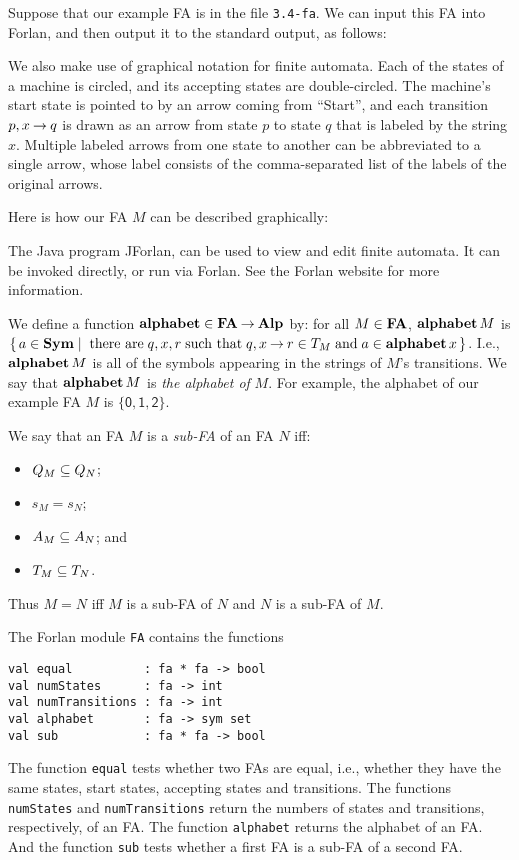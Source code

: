 Suppose that our example FA is in the file \texttt{3.4-fa}.
We can input this FA into Forlan, and then output it to the
standard output, as follows:


We also make use of graphical notation for finite automata.
Each of the states of a machine is circled,
and its accepting states are double-circled.  The machine's start state is
pointed to by an arrow coming from ``Start'', and
each transition $p, x\mathbin{\to} q$ is drawn as an arrow from state $p$
to state $q$ that is labeled by the string $x$.  Multiple labeled
arrows from one state to another can be abbreviated to a single
arrow, whose label consists of the comma-separated list of the
labels of the original arrows.

Here is how our FA $M$ can be described graphically:
\begin{center}

\end{center}

The Java program JForlan, can be used to view and edit finite
automata.  It can be invoked directly, or run via Forlan.  See the
Forlan website for more information.

We define a function $\mathbf{alphabet}\in\mathbf{FA}\mathbin{\to}\mathbf{Alp}$ by: for all $M\in\mathbf{FA}$,
$\mathbf{alphabet}\,M$ is $\{ \, a\in\mathbf{Sym} \mid \;\allowbreak\mbox{there are}\allowbreak\;q,x,r\;\allowbreak\mbox{such
    that}\allowbreak\; q,x\mathbin{\to} r\in T_M\;\allowbreak\mbox{and}\allowbreak\;a\in\mathbf{alphabet}\,x \, \}$.  I.e.,
$\mathbf{alphabet}\,M$ is all of the symbols appearing in the strings of $M$'s
transitions.  We say that $\mathbf{alphabet}\,M$ is \emph{the alphabet of}
$M$.  For example, the alphabet of our example FA $M$ is
$\{\mathsf{0,1,2}\}$.

We say that an FA $M$ is a \emph{sub-FA} of an FA $N$ iff:
\begin{itemize}
\item $Q_M\subseteq Q_N$;
\item $s_M = s_N$;
\item $A_M\subseteq A_N$; and
\item $T_M\subseteq T_N$.
\end{itemize}
Thus $M=N$ iff $M$ is a sub-FA of $N$ and $N$ is a sub-FA of $M$.

The Forlan module \texttt{FA} contains the functions
\begin{verbatim}
val equal          : fa * fa -> bool
val numStates      : fa -> int
val numTransitions : fa -> int
val alphabet       : fa -> sym set
val sub            : fa * fa -> bool
\end{verbatim}
The function \texttt{equal} tests whether two FAs are equal, i.e.,
whether they have the same states, start states, accepting states
and transitions.
The functions \texttt{numStates} and \texttt{numTransitions} return
the numbers of states and transitions, respectively, of an FA.
The function \texttt{alphabet} returns the alphabet of an FA.  
And the function \texttt{sub} tests whether a first FA is a sub-FA of
a second FA.

